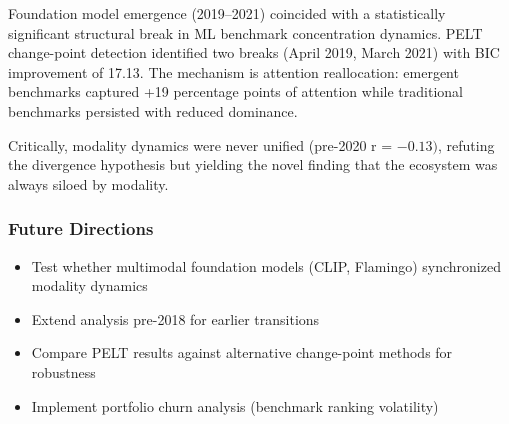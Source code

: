 
Foundation model emergence (2019--2021) coincided with a statistically significant structural break in ML benchmark concentration dynamics. PELT change-point detection identified two breaks (April 2019, March 2021) with BIC improvement of 17.13. The mechanism is attention reallocation: emergent benchmarks captured +19 percentage points of attention while traditional benchmarks persisted with reduced dominance.

Critically, modality dynamics were never unified (pre-2020 r = $-0.13)$, refuting the divergence hypothesis but yielding the novel finding that the ecosystem was always siloed by modality.

\subsubsection{Future Directions}

\begin{itemize}
\item Test whether multimodal foundation models (CLIP, Flamingo) synchronized modality dynamics
\item Extend analysis pre-2018 for earlier transitions
\item Compare PELT results against alternative change-point methods for robustness
\item Implement portfolio churn analysis (benchmark ranking volatility)
\end{itemize}
